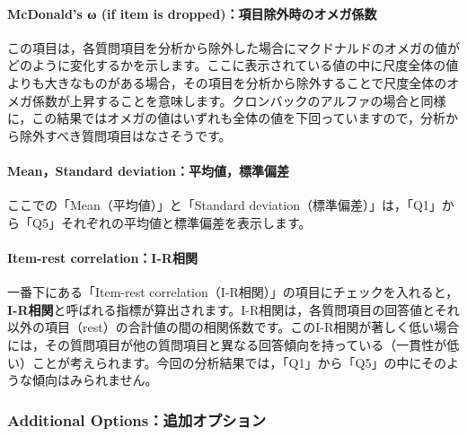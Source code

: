 \documentclass[
  12pt,
  a5jpaper,
  lualatex, ja=standard]{bxjsbook}
\renewcommand{\emph}[1]{\textbf{\color{emph} #1}}
\begin{document}
\hypertarget{mcdonalds-ux3c9-if-item-is-droppedux9805ux76eeux9664ux5916ux6642ux306eux30aaux30e1ux30acux4fc2ux6570}{%
\paragraph{McDonald's ω (if item is dropped)：項目除外時のオメガ係数}\label{mcdonalds-ux3c9-if-item-is-droppedux9805ux76eeux9664ux5916ux6642ux306eux30aaux30e1ux30acux4fc2ux6570}}

この項目は，各質問項目を分析から除外した場合にマクドナルドのオメガの値がどのように変化するかを示します。ここに表示されている値の中に尺度全体の値よりも大きなものがある場合，その項目を分析から除外することで尺度全体のオメガ係数が上昇することを意味します。クロンバックのアルファの場合と同様に，この結果ではオメガの値はいずれも全体の値を下回っていますので，分析から除外すべき質問項目はなさそうです。

\hypertarget{meanstandard-deviationux5e73ux5747ux5024ux6a19ux6e96ux504fux5dee-1}{%
\paragraph*{Mean，Standard deviation：平均値，標準偏差}\label{meanstandard-deviationux5e73ux5747ux5024ux6a19ux6e96ux504fux5dee-1}}

ここでの「Mean（平均値）」と「Standard deviation（標準偏差）」は，「Q1」から「Q5」それぞれの平均値と標準偏差を表示します。

\hypertarget{item-rest-correlationi-rux76f8ux95a2}{%
\paragraph*{Item-rest correlation：I-R相関}\label{item-rest-correlationi-rux76f8ux95a2}}

一番下にある「Item-rest correlation（I-R相関）」の項目にチェックを入れると，\emph{I-R相関}と呼ばれる指標が算出されます。I-R相関は，各質問項目の回答値とそれ以外の項目（rest）の合計値の間の相関係数です。このI-R相関が著しく低い場合には，その質問項目が他の質問項目と異なる回答傾向を持っている（一貫性が低い）ことが考えられます。今回の分析結果では，「Q1」から「Q5」の中にそのような傾向はみられません。

\hypertarget{additional-optionsux8ffdux52a0ux30aaux30d7ux30b7ux30e7ux30f3-1}{%
\subsubsection*{Additional Options：追加オプション}\label{additional-optionsux8ffdux52a0ux30aaux30d7ux30b7ux30e7ux30f3-1}}
\end{document}
